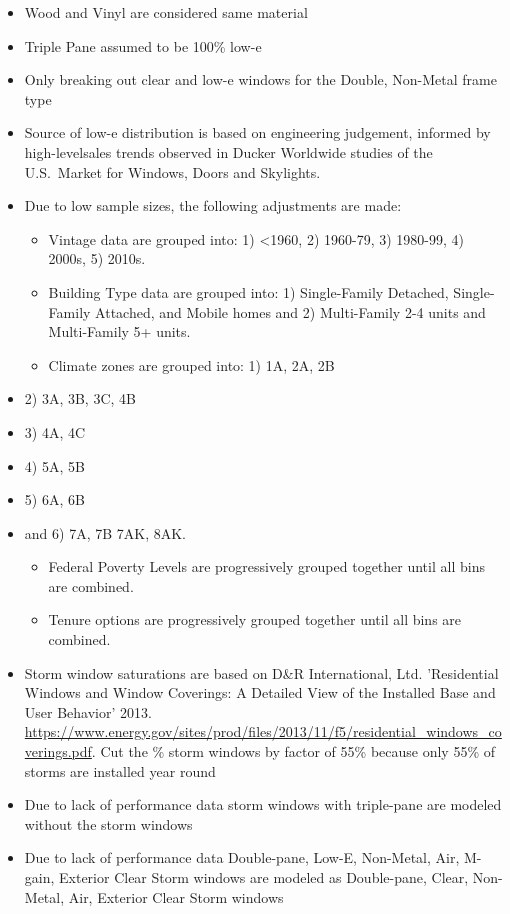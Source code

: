 \begin{itemize}
\item Wood and Vinyl are considered same material
\item Triple Pane assumed to be 100\% low-e
\item Only breaking out clear and low-e windows for the Double, Non-Metal frame type
\item Source of low-e distribution is based on engineering judgement, informed by high-levelsales trends observed in Ducker Worldwide studies of the U.S.~Market for Windows, Doors and Skylights.
\item Due to low sample sizes, the following adjustments are made:
  \begin{itemize}
  \item Vintage data are grouped into: 1) <1960, 2) 1960-79, 3) 1980-99, 4) 2000s, 5) 2010s.
  \item Building Type data are grouped into: 1) Single-Family Detached, Single-Family Attached, and Mobile homes and 2) Multi-Family 2-4 units and Multi-Family 5+ units.
  \item Climate zones are grouped into: 1) 1A, 2A, 2B
  \end{itemize}
\item 2) 3A, 3B, 3C, 4B
\item 3) 4A, 4C
\item 4) 5A, 5B
\item 5) 6A, 6B
\item and 6) 7A, 7B 7AK, 8AK.
  \begin{itemize}
  \item Federal Poverty Levels are progressively grouped together until all bins are combined.
  \item Tenure options are progressively grouped together until all bins are combined.
  \end{itemize}
\item Storm window saturations are based on D\&R International, Ltd. 'Residential Windows and Window Coverings: A Detailed View of the Installed Base and User Behavior' 2013. \href{https://www.energy.gov/sites/prod/files/2013/11/f5/residential_windows_coverings.pdf}{https://www.energy.gov/sites/prod/files/2013/11/f5/residential\_windows\_coverings.pdf}. Cut the \% storm windows by factor of 55\% because only 55\% of storms are installed year round
\item Due to lack of performance data storm windows with triple-pane are modeled without the storm windows
\item Due to lack of performance data Double-pane, Low-E, Non-Metal, Air, M-gain, Exterior Clear Storm windows are modeled as Double-pane, Clear, Non-Metal, Air, Exterior Clear Storm windows
\end{itemize}
